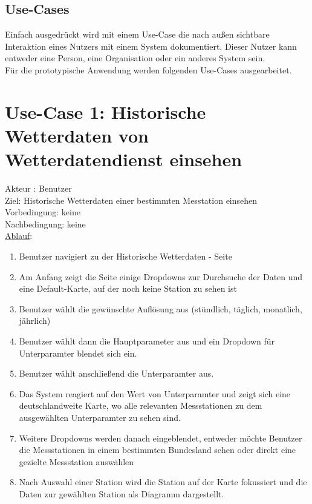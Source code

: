\documentclass[a4paper,12pt]{scrreprt}
\begin{document}
\subsection{Use-Cases}
Einfach ausgedrückt wird mit einem Use-Case die nach außen sichtbare Interaktion eines Nutzers mit einem System dokumentiert. Dieser Nutzer kann entweder eine Person, eine Organisation oder ein anderes System sein.\\
Für die prototypische Anwendung werden folgenden Use-Cases ausgearbeitet.
\section*{\small \textbf{Use-Case 1: Historische Wetterdaten von Wetterdatendienst einsehen}}
Akteur : Benutzer\\
Ziel: Historische Wetterdaten einer bestimmten Messtation einsehen\\
Vorbedingung: keine\\
Nachbedingung: keine\\
\underline{Ablauf}:
\begin{enumerate}
\item Benutzer navigiert zu der Historische Wetterdaten - Seite
\item Am Anfang zeigt die Seite einige Dropdowns zur Durchsuche der Daten und eine Default-Karte, auf der noch keine Station zu sehen ist
\item Benutzer wählt die gewünschte Auflösung aus (stündlich, täglich, monatlich, jährlich)
\item Benutzer wählt dann die Hauptparameter aus und ein Dropdown für Unterparamter blendet sich ein.
\item Benutzer wählt anschließend die Unterparamter aus.
\item Das System reagiert auf den Wert von Unterparamter und zeigt sich eine deutschlandweite Karte, wo alle relevanten Messstationen zu dem ausgewählten Unterparamter zu sehen sind. 
\item Weitere Dropdowns werden danach eingeblendet, entweder möchte Benutzer die Messstationen in einem bestimmten Bundesland sehen oder direkt eine gezielte Messstation auswählen
\item Nach Auswahl einer Station wird die Station auf der Karte fokussiert und die Daten zur gewählten Station als Diagramm dargestellt. 
\end{enumerate}
\end{document}
